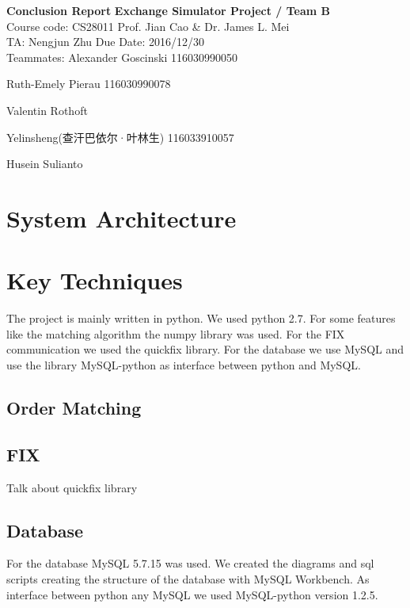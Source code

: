 \documentclass[a4paper, 11pt]{article}
\begin{document}
\noindent

\large\textbf{Conclusion Report}
\hfill \textbf{Exchange Simulator Project / Team B} \\

\normalsize Course code: CS28011 \hfill Prof. Jian Cao \& Dr. James L. Mei\\

TA: Nengjun Zhu  \hfill Due Date: 2016/12/30 \\

Teammates:
Alexander Goscinski 116030990050

Ruth-Emely Pierau 116030990078

Valentin Rothoft

Yelinsheng(查汗巴依尔·叶林生) 116033910057

Husein Sulianto



\section*{System Architecture}
\lipsum[2]

\section*{Key Techniques}

The project is mainly written in python. We used python 2.7. For some features like the matching algorithm the numpy library \cite{numpy} was used.
For the FIX communication we used the quickfix library. For the database we use MySQL and use the library MySQL-python as interface between python and MySQL.
\subsection*{Order Matching}

\subsection*{FIX}
Talk about quickfix library

\subsection*{Database}

For the database MySQL 5.7.15 was used. We created the diagrams and sql scripts creating the structure of the database with MySQL Workbench.
As interface between python any MySQL we used MySQL-python version 1.2.5.
\end{document}
